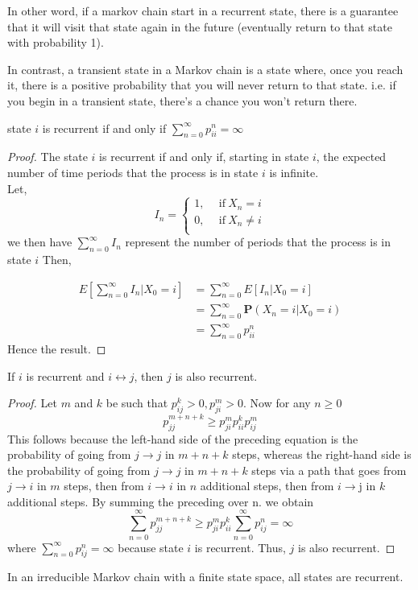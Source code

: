 In other word, if a markov chain start in a recurrent state, there is a guarantee that it will visit that state again in the future
(eventually return to that state with probability 1).

In contrast, a transient state in a Markov chain is a state where, once you reach it, 
there is a positive probability that you will never return to that state.
i.e. if you begin in a transient state, there's a chance you won't return there.

\begin{corollary}
    \label{recurrent}
    state $ i $ is recurrent if and only if  $ \sum_{n=0}^{\infty} p^{n}_{ii}=\infty $
\end{corollary}
\begin{proof}
    The state $ i $ is recurrent if and only if, starting in state  $ i $, the expected number of time periods that the 
    process is in state  $ i $ is infinite. \\ 
    Let, 
    \[
        I_{n} =
        \begin{cases}
            1, \ \ &\text{if}\ X_{n} = i\\ 
            0, \ \ &\text{if}\ X_{n} \neq  i\\ 
        \end{cases}
    \]
    we then have $ \sum_{n=0}^{\infty} I_{n} $ represent the number of periods that the process is in state $ i $ Then,

    \begin{align*}
        E\left[\sum_{n=0}^{\infty} I_{n}|X_{0}=i\right]&= \sum_{n=0}^{\infty} E[I_{n}|X_{0}=i] \\
        &= \sum_{n=0}^{\infty} \mathbf{P}(X_{n}=i|X_{0}=i) \\
        &= \sum_{n=0}^{\infty} p^{n}_{ii} 
    \end{align*}
    Hence the result.
\end{proof}

\begin{theorem}[]
    \label{recurent if communicate}
    If $ i $ is recurrent and $ i\longleftrightarrow j $, then  $ j $ is also recurrent.
\end{theorem}
\begin{proof}
    Let $ m $ and  $ k $ be such that  $ p^{k}_{ij}>0,p^{m}_{ji}>0 $. Now for any $ n\ge 0 $
    \[
        p^{m+n+k}_{jj}\ge p^{m}_{ji}p^{k}_{ii}p^{m}_{ij}
    \]
    This follows because the left-hand side of the preceding equation is the probability of going from $j \to j$ in $m+n+k$ steps, 
    whereas the right-hand side is the probability of going from $j \to j$ in $m+n+k$ steps 
    via a path that goes from $j \to i$ in $m$ steps, then from $i \to i$ in $n$ additional steps, 
    then from $i \to $j in $k$ additional steps. By summing the preceding over n. we obtain
    \[
        \sum_{n=0}^{\infty} p^{m+n+k}_{jj}\ge p^{m}_{ji}p^{k}_{ii} \sum_{n=0}^{\infty}  p^{n}_{ij} = \infty
    \]
     where $ \sum_{n=0}^{\infty}  p^{n}_{ij} = \infty $ because state $ i $ is recurrent. Thus, $j$ is also recurrent.
\end{proof}

\begin{proposition}
     In an irreducible Markov chain with a finite state space, all states are recurrent.
\end{proposition}
